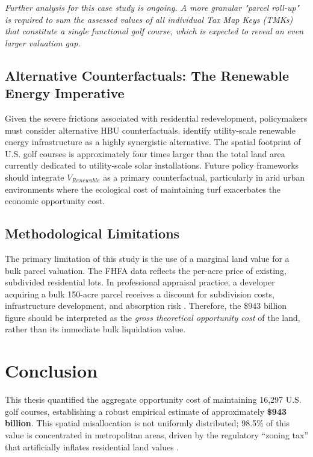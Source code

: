 \documentclass[10pt, letterpaper]{article}
\begin{document}
\textit{Further analysis for this case study is ongoing. A more granular "parcel roll-up" is required to sum the assessed values of all individual Tax Map Keys (TMKs) that constitute a single functional golf course, which is expected to reveal an even larger valuation gap.}

\subsection{Alternative Counterfactuals: The Renewable Energy Imperative}
Given the severe frictions associated with residential redevelopment, policymakers must consider alternative HBU counterfactuals. \textcite{Weinand2025} identify utility-scale renewable energy infrastructure as a highly synergistic alternative. The spatial footprint of U.S. golf courses is approximately four times larger than the total land area currently dedicated to utility-scale solar installations. Future policy frameworks should integrate $V_{Renewable}$ as a primary counterfactual, particularly in arid urban environments where the ecological cost of maintaining turf exacerbates the economic opportunity cost.

\subsection{Methodological Limitations}
The primary limitation of this study is the use of a marginal land value for a bulk parcel valuation. The FHFA data reflects the per-acre price of existing, subdivided residential lots. In professional appraisal practice, a developer acquiring a bulk 150-acre parcel receives a discount for subdivision costs, infrastructure development, and absorption risk \parencite{AppraisalInstitute2020}. Therefore, the \$943 billion figure should be interpreted as the \textit{gross theoretical opportunity cost} of the land, rather than its immediate bulk liquidation value.

\newpage

\section{Conclusion}

This thesis quantified the aggregate opportunity cost of maintaining 16,297 U.S. golf courses, establishing a robust empirical estimate of approximately \textbf{\$943 billion}. This spatial misallocation is not uniformly distributed; 98.5\% of this value is concentrated in metropolitan areas, driven by the regulatory ``zoning tax'' that artificially inflates residential land values \parencite{Glaeser2005, Davis2021}.
\end{document}
